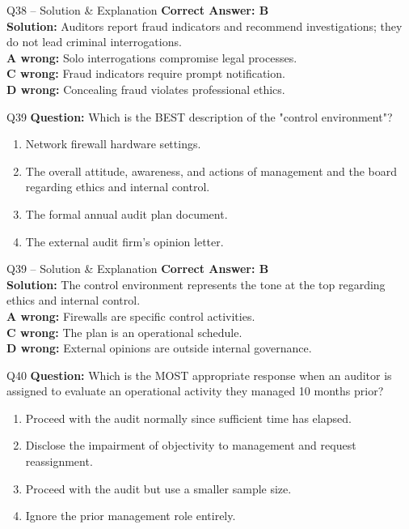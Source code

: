 \documentclass[aspectratio=169,10pt]{beamer}
\begin{document}
	\begin{frame}[t]{Q38 -- Solution \& Explanation}
		\small
		\textbf{Correct Answer: B} \\[4pt]
		\textbf{Solution:} Auditors report fraud indicators and recommend investigations; they do not lead criminal interrogations. \\[4pt]
		\textbf{A wrong:} Solo interrogations compromise legal processes. \\[2pt]
		\textbf{C wrong:} Fraud indicators require prompt notification. \\[2pt]
		\textbf{D wrong:} Concealing fraud violates professional ethics.
	\end{frame}
	
	\begin{frame}[t]{Q39}
		\small
		\textbf{Question:} Which is the BEST description of the "control environment"?
		\begin{enumerate}[label=\Alph*.,itemsep=1pt,topsep=2pt]
			\item Network firewall hardware settings.
			\item The overall attitude, awareness, and actions of management and the board regarding ethics and internal control.
			\item The formal annual audit plan document.
			\item The external audit firm's opinion letter.
		\end{enumerate}
	\end{frame}
	
	\begin{frame}[t]{Q39 -- Solution \& Explanation}
		\small
		\textbf{Correct Answer: B} \\[4pt]
		\textbf{Solution:} The control environment represents the tone at the top regarding ethics and internal control. \\[4pt]
		\textbf{A wrong:} Firewalls are specific control activities. \\[2pt]
		\textbf{C wrong:} The plan is an operational schedule. \\[2pt]
		\textbf{D wrong:} External opinions are outside internal governance.
	\end{frame}
	
	\begin{frame}[t]{Q40}
		\small
		\textbf{Question:} Which is the MOST appropriate response when an auditor is assigned to evaluate an operational activity they managed 10 months prior?
		\begin{enumerate}[label=\Alph*.,itemsep=1pt,topsep=2pt]
			\item Proceed with the audit normally since sufficient time has elapsed.
			\item Disclose the impairment of objectivity to management and request reassignment.
			\item Proceed with the audit but use a smaller sample size.
			\item Ignore the prior management role entirely.
		\end{enumerate}
	\end{frame}
	
\end{document}
